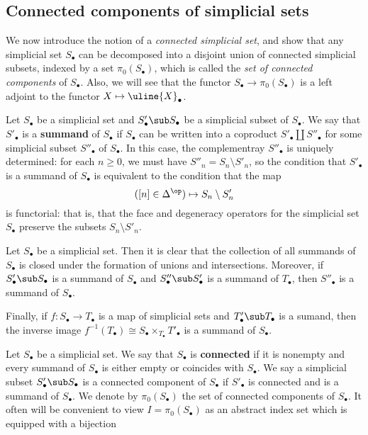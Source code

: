 \subsection{Connected components of simplicial sets}
We now introduce the notion of a \textit{connected simplicial set}, and show that any simplicial set $S_\bullet$ can be decomposed into a disjoint union of connected simplicial subsets, indexed by a set $\pi_0(S_\bullet)$, which is called the \textit{set of connected components} of $S_\bullet$. Also, we will see that the functor $S_\bullet\to\pi_0(S_\bullet)$ is a left adjoint to the functor $X\mapsto\uline{X}_\bullet$.\par
Let $S_\bullet$ be a simplicial set and $S'_\bullet\sub S_\bullet$ be a simplicial subset of $S_\bullet$. We say that $S'_\bullet$ is a \textbf{summand} of $S_\bullet$ if $S_\bullet$ can be written into a coproduct $S'_\bullet\amalg S''_\bullet$ for some simplicial subset $S''_\bullet$ of $S_\bullet$. In this case, the complementray $S''_\bullet$ is uniquely determined: for each $n\geq 0$, we must have $S''_n=S_n\setminus S'_n$, so the condition that $S'_\bullet$ is a summand of $S_\bullet$ is equivalent to the condition that the map
\[([n]\in\Delta^{\op})\mapsto S_n\setminus S'_n\]
is functorial: that is, that the face and degeneracy operators for the simplicial set $S_\bullet$ preserve the subsets $S_n\setminus S'_n$.
\begin{remark}\label{simplicial set summand prop}
Let $S_\bullet$ be a simplicial set. Then it is clear that the collection of all summands of $S_\bullet$ is closed under the formation of unions and intersections. Moreover, if $S'_\bullet\sub S_\bullet$ is a summand of $S_\bullet$ and $S''_\bullet\sub S'_\bullet$ is a summand of $T_\bullet$, then $S''_\bullet$ is a summand of $S_\bullet$.\par
Finally, if $f:S_\bullet\to T_\bullet$ is a map of simplicial sets and $T'_\bullet\sub T_\bullet$ is a sumand, then the inverse image $f^{-1}(T_\bullet)\cong S_\bullet\times_{T_\bullet}T'_\bullet$ is a summand of $S_\bullet$.
\end{remark}
Let $S_\bullet$ be a simplicial set. We say that $S_\bullet$ is \textbf{connected} if it is nonempty and every summand of $S_\bullet$ is either empty or coincides with $S_\bullet$. We say a simplicial subset $S'_\bullet\sub S_\bullet$ is a connected component of $S_\bullet$ if $S'_\bullet$ is connected and is a summand of $S_\bullet$. We denote by $\pi_0(S_\bullet)$ the set of connected components of $S_\bullet$. It often will be convenient to view $I=\pi_0(S_\bullet)$ as an abstract index set which is equipped with a bijection
